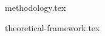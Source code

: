 \documentclass[a4paper,11pt,twoside]{report}
\begin{document}
{methodology.tex}




{theoretical-framework.tex}





\end{document}
